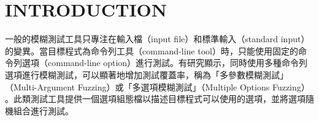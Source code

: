 \section{INTRODUCTION}
\label{ch:introduction}

\iffalse

模糊測試工具（fuzzer）的核心方法是向目標程式（target program）快速提供大量隨機的輸入，這些輸入對於目標程式可能是格式錯誤或非預期的，用以發現目標程式中的漏洞、錯誤或異常行為。透過模糊測試，可以檢測出潛在的安全風險，例如緩衝區溢位、程式崩潰等，這些問題都可能成為攻擊者利用的切入點。近年來，隨著研究不斷地發展，模糊測試的有效性已在多個案例中得到證實，其中尤以 AFL（American Fuzzy Lop）\cite{zalewski2017afl} 最為重要且廣為人知，許多最先進的模糊測試工具皆基於 AFL 修改、實作 \cite{fioraldi2020afl++,pham2019smart,bohme2017directed}。

\if false
模糊測試的本質是一種基因算法（Genetic Algorithms, GAs）\cite{holland1992genetic}，是一類靈感源自自然進化過程的最佳化隨機搜索技術，擅長在廣闊的輸入空間（input space）中最佳化目標問題的答案。有許多研究指出，測試覆蓋率（coverage）為軟體測試的一個重要的指標，越高的覆蓋率通常也代表有更高的機率找出問題 \cite{kochhar2015code,bohme2022reliability}。包含 AFL 在內的一類模糊測試工具，將模糊測試視為找到一組輸入，使測試覆蓋率最大化的最佳化問題。此類方法也被稱為覆蓋率導向模糊測試（Coverage-Guided Fuzzing）。

模糊測試的過程中，每一個提供給目標程式的輸入也稱為種子（seed）。模糊測試利用基因演算法多次的繁衍與篩選種子，生成多樣化的測試輸入。基因演算法根據適應值函數（fitness function）評估一個種子的價值，優勝劣敗。對於覆蓋率導向模糊測試而言，一個種子的適應值是其能夠提供目標程式的覆蓋率。隨著測試的進行，種子池（seed pool）中的種子會越來越多，也代表測試覆蓋率的提升。每當有新的種子生成就會進行適應值評估，若無法提供更多的覆蓋率，便會將其淘汰，反之加入種子池中；適者生存，不適者淘汰。

相較於單純隨機搜索，基因演算法利用「交叉（crossover）、變異（mutation）」等操作產生新的候選解。在 AFL 中，也採用了交叉、變異的方式繁衍種子個體，所有產生的種子皆是初始種子（initial seed）的後代。一個種子代表著一種程式的執行路徑，透過變動父代種子產生子代，期望新的種子能夠因此有不同的執行路徑，進而產生新的程式覆蓋率，這就是覆蓋率導向模糊測試的原理。
\fi

一般的模糊測試工具只專注在輸入檔（input file）和標準輸入（standard input）的變異。當目標程式為命令列工具（command-line tool）時，只能使用固定的命令列選項（command-line option）進行測試。有研究顯示，同時使用多種命令列選項進行模糊測試，可以顯著地增加測試覆蓋率，稱為「多參數模糊測試」（Multi-Argument Fuzzing）或「多選項模糊測試」（Multiple Options Fuzzing） \cite{wu2020sq,tseng2023wei,lu2022guan,tsai2024Multiple} 。此類測試工具提供一個選項組態檔以描述目標程式可以使用的選項，並將選項隨機組合進行測試。

